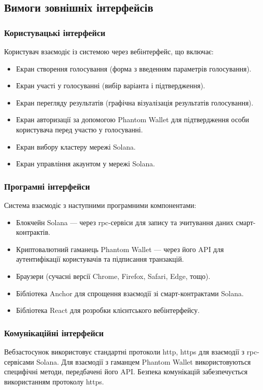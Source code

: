 \documentclass[14pt]{extreport}
\begin{document}
  \subsection{Вимоги зовнішніх інтерфейсів}
  \subsubsection{Користувацькі інтерфейси}
  Користувач взаємодіє із системою через вебінтерфейс, що включає:
  \begin{itemize}
    \item Екран створення голосування (форма з введенням параметрів голосування).
    \item Екран участі у голосуванні (вибір варіанта і підтвердження).
    \item Екран перегляду результатів (графічна візуалізація результатів голосування).
    \item Екран авторизації за допомогою Phantom Wallet для підтвердження особи користувача перед участю у голосуванні.
    \item Екран вибору кластеру мережі Solana.
    \item Екран управління акаунтом у мережі Solana.
  \end{itemize}
  
  \subsubsection{Програмні інтерфейси}
  Система взаємодіє з наступними програмними компонентами:
  \begin{itemize}
    \item Блокчейн Solana — через \gls{rpc}-сервіси для запису та зчитування даних смарт-контрактів.
    \item Криптовалютний гаманець Phantom Wallet — через його API для аутентифікації користувачів та підписання транзакцій.
    \item Браузери (сучасні версії Chrome, Firefox, Safari, Edge, тощо).
    \item Бібліотека Anchor для спрощення взаємодії зі смарт-контрактами Solana.
    \item Бібліотека React для розробки клієнтського вебінтерфейсу.
  \end{itemize}
  
  \subsubsection{Комунікаційні інтерфейси}
  Вебзастосунок використовує стандартні протоколи \gls{http}, \gls{https} для взаємодії з \gls{rpc}-сервісами Solana. Для взаємодії з гаманцем Phantom Wallet використовуються специфічні методи, передбачені його API. Безпека комунікацій забезпечується використанням протоколу \gls{https}.
  
\end{document}
